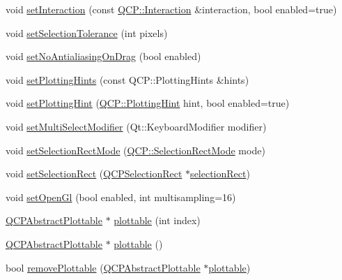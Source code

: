 \begin{DoxyCompactItemize}
void \hyperlink{class_q_custom_plot_a422bf1bc6d56dac75a3d805d9a65902c}{set\+Interaction} (const \hyperlink{namespace_q_c_p_a2ad6bb6281c7c2d593d4277b44c2b037}{Q\+C\+P\+::\+Interaction} \&interaction, bool enabled=true)
\item 
void \hyperlink{class_q_custom_plot_a4dc31241d7b09680950e19e5f971ed93}{set\+Selection\+Tolerance} (int pixels)
\item 
void \hyperlink{class_q_custom_plot_a775bdcb6329d44701aeaa6135b0e5265}{set\+No\+Antialiasing\+On\+Drag} (bool enabled)
\item 
void \hyperlink{class_q_custom_plot_a94a33cbdadbbac5934843508bcfc210d}{set\+Plotting\+Hints} (const Q\+C\+P\+::\+Plotting\+Hints \&hints)
\item 
void \hyperlink{class_q_custom_plot_a3b7c97bb6c16464e9e15190c07abe9a9}{set\+Plotting\+Hint} (\hyperlink{namespace_q_c_p_a5400e5fcb9528d92002ddb938c1f4ef4}{Q\+C\+P\+::\+Plotting\+Hint} hint, bool enabled=true)
\item 
void \hyperlink{class_q_custom_plot_a8fc96e3b5138a06759a2a90c166df516}{set\+Multi\+Select\+Modifier} (Qt\+::\+Keyboard\+Modifier modifier)
\item 
void \hyperlink{class_q_custom_plot_a810ef958ebe84db661c7288b526c0deb}{set\+Selection\+Rect\+Mode} (\hyperlink{namespace_q_c_p_ac9aa4d6d81ac76b094f9af9ad2d3aacf}{Q\+C\+P\+::\+Selection\+Rect\+Mode} mode)
\item 
void \hyperlink{class_q_custom_plot_a0c09f96df15faa4799ad7051bb16cf33}{set\+Selection\+Rect} (\hyperlink{class_q_c_p_selection_rect}{Q\+C\+P\+Selection\+Rect} $\ast$\hyperlink{class_q_custom_plot_ae64a3994735d8f592a60d9430526a163}{selection\+Rect})
\item 
void \hyperlink{class_q_custom_plot_a7db1adc09016329f3aef7c60da935789}{set\+Open\+Gl} (bool enabled, int multisampling=16)
\item 
\hyperlink{class_q_c_p_abstract_plottable}{Q\+C\+P\+Abstract\+Plottable} $\ast$ \hyperlink{class_q_custom_plot_a32de81ff53e263e785b83b52ecd99d6f}{plottable} (int index)
\item 
\hyperlink{class_q_c_p_abstract_plottable}{Q\+C\+P\+Abstract\+Plottable} $\ast$ \hyperlink{class_q_custom_plot_adea38bdc660da9412ba69fb939031567}{plottable} ()
\item 
bool \hyperlink{class_q_custom_plot_af3dafd56884208474f311d6226513ab2}{remove\+Plottable} (\hyperlink{class_q_c_p_abstract_plottable}{Q\+C\+P\+Abstract\+Plottable} $\ast$\hyperlink{class_q_custom_plot_a32de81ff53e263e785b83b52ecd99d6f}{plottable})

\end{DoxyCompactItemize}
